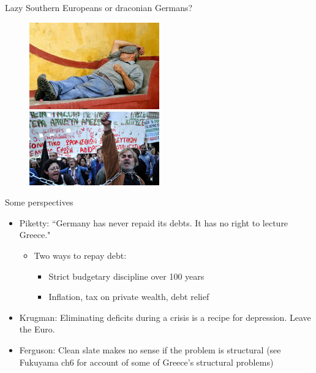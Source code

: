 \documentclass{beamer}
\begin{document}
\begin{frame}{Lazy Southern Europeans or draconian Germans?}
\begin{figure}
    \includegraphics[width=0.5\textwidth]{../img/siesta.jpg}
    \includegraphics[width=0.5\textwidth]{../img/austerity.jpg}    
\end{figure}{}
\end{frame}{}

\begin{frame}{Some perspectives}
\begin{itemize}
    \item Piketty: ``Germany has never repaid its debts. It has no right to lecture Greece."\pause
    \begin{itemize}
        \item Two ways to repay debt:
        \begin{itemize}
            \item Strict budgetary discipline over 100 years\pause
            \item Inflation, tax on private wealth, debt relief\pause
        \end{itemize}{}
    \end{itemize}{}
    \item Krugman: Eliminating deficits during a crisis is a recipe for depression. Leave the Euro.\pause
    \item Ferguson: Clean slate makes no sense if the problem is structural (see Fukuyama ch6 for account of some of Greece's structural problems)
\end{itemize}{}
\end{frame}{}
\end{document}
